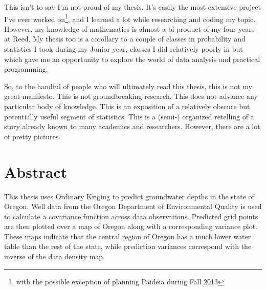 \documentclass[12pt,twoside]{reedthesis}
\begin{document}
	This isn't to say I'm not proud of my thesis. It's easily the most extensive project I've ever worked on\footnote{with the possible exception of planning Paideia during Fall 2013}, and I learned a lot while researching and coding my topic. However, my knowledge of mathematics is almost a bi-product of my four years at Reed. My thesis too is a corollary to a couple of classes in probability and statistics I took during my Junior year, classes I did relatively poorly in but which gave me an opportunity to explore the world of data analysis and practical programming. 
	
	So, to the handful of people who will ultimately read this thesis, this is not my great manifesto. This is not groundbreaking research. This does not advance any particular body of knowledge. This is an exposition of a relatively obscure but potentially useful segment of statistics. This is a (semi-) organized retelling of a story already known to many academics and researchers. However, there are a lot of pretty pictures. 
	
	
	
	
	
    \tableofcontents
    \listoftables
    \listoffigures

    \chapter*{Abstract}
    
    This thesis uses Ordinary Kriging to predict groundwater depths in the state of Oregon. Well data from the Oregon Department of Environmental Quality is used to calculate a covariance function across data observations. Predicted grid points are then plotted over a map of Oregon along with a corresponding variance plot. These maps indicate that the central region of Oregon has a much lower water table than the rest of the state, while prediction variances correspond with the inverse of the data density map.    
    
	
\end{document}
